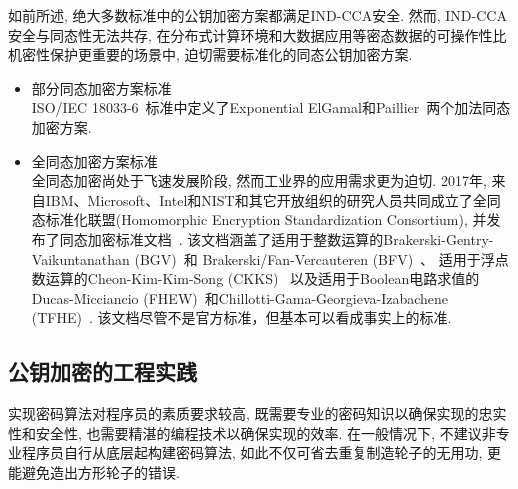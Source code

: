 如前所述, 绝大多数标准中的公钥加密方案都满足IND-CCA安全. 然而, IND-CCA安全与同态性无法共存, 
在分布式计算环境和大数据应用等密态数据的可操作性比机密性保护更重要的场景中, 迫切需要标准化的同态公钥加密方案. 

\begin{itemize}
\item 部分同态加密方案标准\\ 
    ISO/IEC 18033-6~\cite{ISO/IEC-18033-6}标准中定义了Exponential ElGamal和Paillier~\cite{Paillier-EUROCRYPT-1999}两个加法同态加密方案. 

\item 全同态加密方案标准\\
    全同态加密尚处于飞速发展阶段, 然而工业界的应用需求更为迫切. 
    2017年, 来自IBM、Microsoft、Intel和NIST和其它开放组织的研究人员共同成立了全同态标准化联盟(Homomorphic Encryption Standardization Consortium), 
    并发布了同态加密标准文档~\cite{HE-Standard}. 该文档涵盖了适用于整数运算的Brakerski-Gentry-Vaikuntanathan (BGV)~\cite{BGV-TOCT-2014}和
    Brakerski/Fan-Vercauteren (BFV)~\cite{Brakerski-CRYPTO-2012, FV-ePrint-2012}、
    适用于浮点数运算的Cheon-Kim-Kim-Song (CKKS)~\cite{CKKS-ASIACRYPT-2017}
    以及适用于Boolean电路求值的Ducas-Micciancio (FHEW)~\cite{DM-EUROCRYPT-2015}和Chillotti-Gama-Georgieva-Izabachene (TFHE)~\cite{CGGI-JoC-2020}.
    该文档尽管不是官方标准，但基本可以看成事实上的标准.  
\end{itemize}

\subsection{公钥加密的工程实践}
实现密码算法对程序员的素质要求较高, 既需要专业的密码知识以确保实现的忠实性和安全性, 也需要精湛的编程技术以确保实现的效率. 
在一般情况下, 不建议非专业程序员自行从底层起构建密码算法, 如此不仅可省去重复制造轮子的无用功, 更能避免造出方形轮子的错误. 

